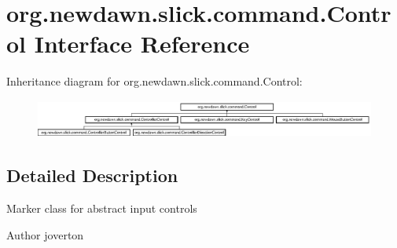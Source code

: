 \hypertarget{interfaceorg_1_1newdawn_1_1slick_1_1command_1_1_control}{}\section{org.\+newdawn.\+slick.\+command.\+Control Interface Reference}
\label{interfaceorg_1_1newdawn_1_1slick_1_1command_1_1_control}
Inheritance diagram for org.\+newdawn.\+slick.\+command.\+Control\+:\begin{figure}[H]
\begin{center}
\leavevmode
\includegraphics[height=1.257485cm]{interfaceorg_1_1newdawn_1_1slick_1_1command_1_1_control}
\end{center}
\end{figure}


\subsection{Detailed Description}
Marker class for abstract input controls

\begin{DoxyAuthor}{Author}
joverton 
\end{DoxyAuthor}
